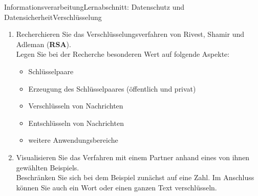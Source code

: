\documentclass[oneside,openany,headings=optiontotoc,11pt,numbers=noenddot]{scrreprt}
\begin{document}
	\begin{worksheet}{Informationsverarbeitung}{Lernabschnitt: Datenschutz und Datensicherheit}{Verschlüsselung}
		\noindent
		\sffamily
		\begin{framed}
			\begin{enumerate}
				\item Recherchieren Sie das Verschlüsselungsverfahren von Rivest, Shamir und Adleman (\textbf{RSA}).\\
				Legen Sie bei der Recherche besonderen Wert auf folgende Aspekte:
				\begin{itemize}[label=+]
					\item Schlüsselpaare
					\item Erzeugung des Schlüsselpaares (öffentlich und privat)
					\item Verschlüsseln von Nachrichten
					\item Entschlüsseln von Nachrichten
					\item weitere Anwendungsbereiche
				\end{itemize}
				\item Visualisieren Sie das Verfahren mit einem Partner anhand eines von ihnen gewählten Beispiels.\\
				Beschränken Sie sich bei dem Beispiel zunächst auf eine Zahl. Im Anschluss können Sie auch ein Wort oder einen ganzen Text verschlüsseln.
			\end{enumerate}
		\end{framed}
	\end{worksheet}
\end{document}
